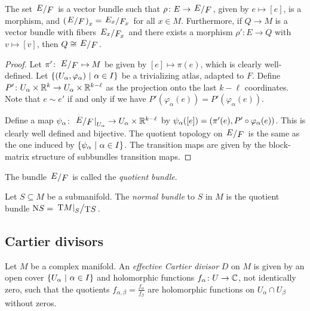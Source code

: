 \begin{trditev}
The set $\kvoc{E}{F}$ is a vector bundle such that
$\rho \colon E \to \kvoc{E}{F}$, given by $e \mapsto [e]$, is a
morphism, and $\br{\kvoc{E}{F}}_x = \kvoc{E_x}{F_x}$ for all
$x \in M$. Furthermore, if $Q \to M$ is a vector bundle with fibers
$\kvoc{E_x}{F_x}$ and there exists a morphism
$\rho' \colon E \to Q$ with $v \mapsto [v]$, then
$Q \cong \kvoc{E}{F}$.
\end{trditev}

\begin{proof}
Let $\pi' \colon \kvoc{E}{F} \mapsto M$ be given by
$[e] \mapsto \pi(e)$, which is clearly well-defined. Let
$\left\{(U_\alpha, \varphi_\alpha)~\middle\vert~\alpha \in I\right\}$ be a trivializing
atlas, adapted to $F$. Define
$P' \colon U_\alpha \times \mathbb{R}^k \to U_\alpha \times \mathbb{R}^{k-\ell}$
as the projection onto the last $k-\ell$ coordinates. Note that
$e \sim e'$ if and only if we have
$P'(\varphi_\alpha(e)) = P'(\varphi_\alpha(e))$.

Define a map
$\psi_\alpha \colon
\eval{\kvoc{E}{F}}{U_\alpha}{} \to U_\alpha \times \R^{k-\ell}$ by
$\psi_\alpha([e]) = \left(\pi'(e), P' \circ \varphi_\alpha(e)\right)$. This
is clearly well defined and bijective. The quotient topology on
$\kvoc{E}{F}$ is the same as the one induced by
$\left\{\psi_\alpha~\middle\vert~\alpha \in I\right\}$. The transition maps are given
by the block-matrix structure of subbundles transition maps.
\end{proof}

\begin{definicija}
The bundle $\kvoc{E}{F}$ is called the
\emph{quotient bundle}.
\end{definicija}

\begin{definicija}
Let $S \subseteq M$ be a submanifold. The
\emph{normal bundle} to $S$ in $M$ is the
quotient bundle
$\operatorname{N}\!S = \kvoc{\eval{\Tang\! M}{S}{}}{\Tang\! S}$.
\end{definicija}

\newpage

\subsection{Cartier divisors}

\begin{definicija}
Let $M$ be a complex manifold. An
\emph{effective Cartier divisor} $D$ on $M$
is given by an open cover $\left\{U_\alpha~\middle\vert~\alpha \in I\right\}$ and
holomorphic functions $f_\alpha \colon U \to \mathbb{C}$, not identically
zero, such that the quotients
$f_{\alpha, \beta} = \frac{f_\alpha}{f_\beta}$ are holomorphic
functions on $U_\alpha \cap U_\beta$ without zeros.
\end{definicija}

